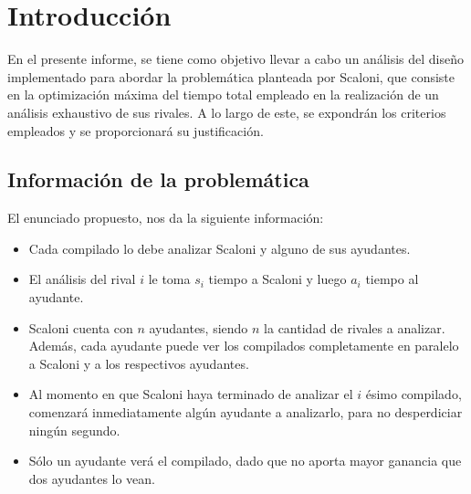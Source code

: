 \section{Introducción}

En el presente informe, se tiene como objetivo llevar a cabo un análisis del diseño 
implementado para abordar la problemática planteada por Scaloni, que consiste en la 
optimización máxima del tiempo total empleado en la realización de un análisis exhaustivo 
de sus rivales. A lo largo de este, se expondrán los criterios empleados y se proporcionará 
su justificación.


\subsection{Información de la problemática}

El enunciado propuesto, nos da la siguiente información:

\begin{itemize}

    \item Cada compilado lo debe analizar Scaloni y alguno de sus ayudantes.

    \item El análisis del rival $i$ le toma $s_i$ tiempo a Scaloni y luego $a_i$ tiempo al ayudante.

    \item Scaloni cuenta con $n$ ayudantes, siendo $n$ la cantidad de rivales a analizar. Además, cada
        ayudante puede ver los compilados completamente en paralelo a Scaloni y a los respectivos ayudantes.

    \item Al momento en que Scaloni haya terminado de analizar el $i$ ésimo compilado, comenzará
        inmediatamente algún ayudante a analizarlo, para no desperdiciar ningún segundo.

    \item Sólo un ayudante verá el compilado, dado que no aporta mayor ganancia que dos ayudantes lo vean.

\end{itemize}
